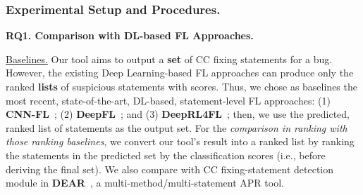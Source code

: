 \subsubsection{Experimental Setup and Procedures.\\}

{\bf RQ1. Comparison with DL-based FL Approaches.}

\underline{Baselines.}
Our tool aims to output a {\bf set} of CC fixing
statements for a bug. However, the existing Deep Learning-based FL
approaches can produce only the ranked {\bf lists} of suspicious
statements with scores. Thus, we chose as baselines the most
recent, state-of-the-art, DL-based, statement-level FL approaches:
(1) \textbf{CNN-FL}~\cite{zhang2019cnn}; (2) {\bf
DeepFL}~\cite{DeepFL}; and (3) {\bf DeepRL4FL}~\cite{icse21-fl}; then,
we use the predicted, ranked list of statements as the output set.
For the {\em comparison in ranking with those ranking baselines}, we convert our
tool's result into a ranked list by ranking the statements in the
predicted set by the classification scores (i.e., before deriving the
final set). We also compare with CC fixing-statement detection module
in {\bf DEAR}~\cite{icse22}, a multi-method/multi-statement APR tool.







